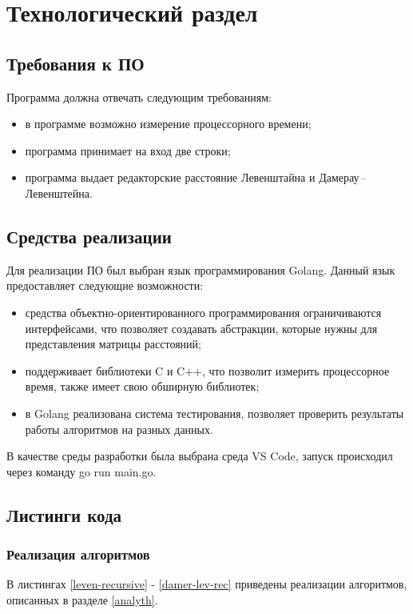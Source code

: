 \chapter{Технологический раздел}

\section{Требования к ПО}
Программа должна отвечать следующим требованиям:
\begin{itemize}
	\item в программе возможно измерение процессорного времени;
	\item программа принимает на вход две строки;
	\item программа выдает редакторские расстояние Левенштайна и Дамерау\,--\,Левенштейна. 
\end{itemize}
\section{Средства реализации}
Для реализации ПО был выбран язык программирования Golang\cite{golang}. Данный язык предоставляет следующие возможности:
\begin{itemize} 
	\item средства объектно-ориентированного программирования ограничиваются интерфейсами, что позволяет создавать абстракции, которые нужны для представления матрицы расстояний;
	\item поддерживает библиотеки C и C++, что позволит измерить процессорное время, также имеет свою обширную библиотек;
	\item в Golang реализована система тестирования, позволяет проверить результаты работы алгоритмов на разных данных.
\end{itemize}

В качестве среды разработки была выбрана среда VS Code\cite{rune}, запуск происходил через команду go run main.go.

\section{Листинги кода}
\subsection{Реализация алгоритмов}



В листингах \ref{leven-recursive} - \ref{damer-lev-rec} приведены реализации алгоритмов, описанных в разделе \ref{analyth}.


